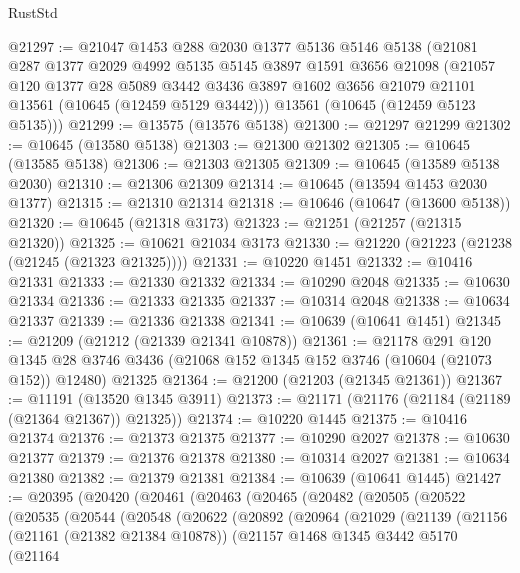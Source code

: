 \begin{lexlean}{RustStd}
\begin{coremodule}
@21297 := @21047
    @1453
    @288
    @2030
    @1377
    @5136
    @5146
    @5138
    (@21081
      @287
      @1377
      @2029
      @4992
      @5135
      @5145
      @3897
      @1591
      @3656
      @21098
      (@21057
        @120
        @1377
        @28
        @5089
        @3442
        @3436
        @3897
        @1602
        @3656
        @21079
        @21101
        @13561
        (@10645 (@12459 @5129 @3442)))
      @13561
      (@10645 (@12459 @5123 @5135)))
@21299 := @13575 (@13576 @5138)
@21300 := @21297 @21299
@21302 := @10645 (@13580 @5138)
@21303 := @21300 @21302
@21305 := @10645 (@13585 @5138)
@21306 := @21303 @21305
@21309 := @10645 (@13589 @5138 @2030)
@21310 := @21306 @21309
@21314 := @10645 (@13594 @1453 @2030 @1377)
@21315 := @21310 @21314
@21318 := @10646 (@10647 (@13600 @5138))
@21320 := @10645 (@21318 @3173)
@21323 := @21251 (@21257 (@21315 @21320))
@21325 := @10621 @21034 @3173
@21330 := @21220 (@21223 (@21238 (@21245 (@21323 @21325))))
@21331 := @10220 @1451
@21332 := @10416 @21331
@21333 := @21330 @21332
@21334 := @10290 @2048
@21335 := @10630 @21334
@21336 := @21333 @21335
@21337 := @10314 @2048
@21338 := @10634 @21337
@21339 := @21336 @21338
@21341 := @10639 (@10641 @1451)
@21345 := @21209 (@21212 (@21339 @21341 @10878))
@21361 := @21178
    @291
    @120
    @1345
    @28
    @3746
    @3436
    (@21068 @152 @1345 @152 @3746 (@10604 (@21073 @152)) @12480)
    @21325
@21364 := @21200 (@21203 (@21345 @21361))
@21367 := @11191 (@13520 @1345 @3911)
@21373 := @21171 (@21176 (@21184 (@21189 (@21364 @21367)) @21325))
@21374 := @10220 @1445
@21375 := @10416 @21374
@21376 := @21373 @21375
@21377 := @10290 @2027
@21378 := @10630 @21377
@21379 := @21376 @21378
@21380 := @10314 @2027
@21381 := @10634 @21380
@21382 := @21379 @21381
@21384 := @10639 (@10641 @1445)
@21427 := @20395
    (@20420
      (@20461
        (@20463
          (@20465
            (@20482
              (@20505
                (@20522
                  (@20535
                    (@20544
                      (@20548
                        (@20622
                          (@20892
                            (@20964
                              (@21029
                                (@21139
                                  (@21156
                                    (@21161 (@21382 @21384 @10878))
                                    (@21157
                                      @1468
                                      @1345
                                      @3442
                                      @5170
                                      (@21164

\end{coremodule}
\end{lexlean}
